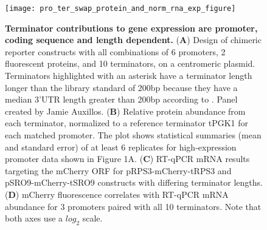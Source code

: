 \documentclass[../main.tex]{subfiles}
\begin{document}
\begin{figure}[p]

{\centering \texttt{[image: pro\_ter\_swap\_protein\_and\_norm\_rna\_exp\_figure]} 

}

\caption[Terminator contributions to gene expression are promoter, coding sequence and length dependent.]{\textbf{Terminator contributions to gene expression are promoter, coding sequence and length dependent.} (\textbf{A}) Design of chimeric reporter constructs with all combinations of 6 promoters, 2 fluorescent proteins, and 10 terminators, on a centromeric plasmid. Terminators highlighted with an asterisk have a terminator length longer than the library standard of 200bp because they have a median 3'UTR length greater than 200bp according to \parencite{Pelechano2013}. Panel created by Jamie Auxillos.  (\textbf{B}) Relative protein abundance from each terminator, normalized to a reference terminator tPGK1 for each matched promoter. The plot shows statistical summaries (mean and standard error) of at least 6 replicates for high-expression promoter data shown in Figure 1A. (\textbf{C}) RT-qPCR mRNA results targeting the mCherry ORF for pRPS3-mCherry-tRPS3 and pSRO9-mCherry-tSRO9 constructs with differing terminator lengths. (\textbf{D}) mCherry fluorescence correlates with RT-qPCR mRNA abundance for 3 promoters paired with all 10 terminators. Note that both axes use a \(log_2\) scale.}\label{fig:pro-ter-platereader-mCherry-mTurq-norm}
\end{figure}
\end{document}
